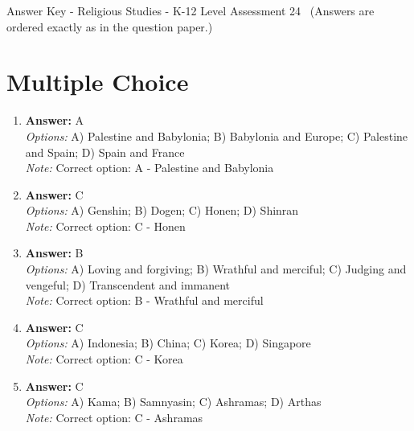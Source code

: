 \documentclass[12pt]{article}
\begin{document}
\begin{center}
Answer Key - Religious Studies - K-12 Level Assessment 24 \
\small (Answers are ordered exactly as in the question paper.)
\end{center}

\section*{Multiple Choice}
\begin{enumerate}[label=\arabic*.]
\item \textbf{Answer:} A
\\ \textit{Options:} A) Palestine and Babylonia; B) Babylonia and Europe; C) Palestine and Spain; D) Spain and France
\\ \textit{Note:} Correct option: A - Palestine and Babylonia
\item \textbf{Answer:} C
\\ \textit{Options:} A) Genshin; B) Dogen; C) Honen; D) Shinran
\\ \textit{Note:} Correct option: C - Honen
\item \textbf{Answer:} B
\\ \textit{Options:} A) Loving and forgiving; B) Wrathful and merciful; C) Judging and vengeful; D) Transcendent and immanent
\\ \textit{Note:} Correct option: B - Wrathful and merciful
\item \textbf{Answer:} C
\\ \textit{Options:} A) Indonesia; B) China; C) Korea; D) Singapore
\\ \textit{Note:} Correct option: C - Korea
\item \textbf{Answer:} C
\\ \textit{Options:} A) Kama; B) Samnyasin; C) Ashramas; D) Arthas
\\ \textit{Note:} Correct option: C - Ashramas
\end{enumerate}
\end{document}

